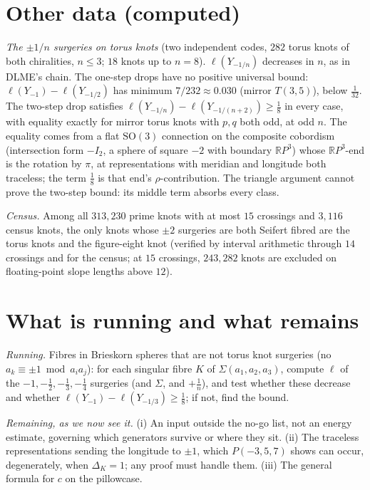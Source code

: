 \documentclass[10pt]{amsart}
\numberwithin{equation}{section}
\newcommand{\st}[1]{\par\noindent\textit{#1}\enspace}
\newcommand{\SO}{\mathrm{SO}}
\begin{document}
\section{Other data (computed)}

\st{The $\pm1/n$ surgeries on torus knots} (two independent codes, $282$
torus knots of both chiralities, $n\le3$; $18$ knots up to $n=8$).
$\ell(Y_{-1/n})$ decreases in $n$, as in DLME's chain. The one-step drops
have no positive universal bound: $\ell(Y_{-1})-\ell(Y_{-1/2})$ has minimum
$7/232\approx0.030$ (mirror $T(3,5)$), below $\frac1{32}$. The two-step drop
satisfies $\ell(Y_{-1/n})-\ell(Y_{-1/(n+2)})\ge\frac18$ in every case, with
equality exactly for mirror torus knots with $p,q$ both odd, at odd $n$. The
equality comes from a flat $\SO(3)$ connection on the composite cobordism
(intersection form $-I_2$, a sphere of square $-2$ with boundary $\mathbb{R}P^3$)
whose $\mathbb{R}P^3$-end is the rotation by $\pi$, at representations with
meridian and longitude both traceless; the term $\frac18$ is that end's
$\rho$-contribution. The triangle argument cannot prove the two-step bound:
its middle term absorbs every class.

\st{Census.} Among all $313{,}230$ prime knots with at most $15$
crossings and $3{,}116$ census knots, the only knots whose $\pm2$ surgeries
are both Seifert fibred are the torus knots and the figure-eight knot
(verified by interval arithmetic through $14$ crossings and for the
census; at $15$ crossings, $243{,}282$ knots are excluded on floating-point
slope lengths above $12$).

\section{What is running and what remains}

\st{Running.} Fibres in Brieskorn spheres that are not torus knot surgeries
(no $a_k\equiv\pm1\bmod a_ia_j$): for each singular fibre $K$ of
$\Sigma(a_1,a_2,a_3)$, compute $\ell$ of the $-1,-\frac12,-\frac13,-\frac14$
surgeries (and $\Sigma$, and $+\frac1n$), and test whether these decrease
and whether $\ell(Y_{-1})-\ell(Y_{-1/3})\ge\frac18$; if not, find the bound.

\st{Remaining, as we now see it.} (i) An input outside the no-go list,
not an energy estimate, governing which generators survive or where they
sit. (ii) The traceless representations sending the longitude to $\pm1$,
which $P(-3,5,7)$ shows can occur, degenerately, when $\Delta_K=1$; any
proof must handle them. (iii) The general formula for $c$ on the pillowcase.
\end{document}
